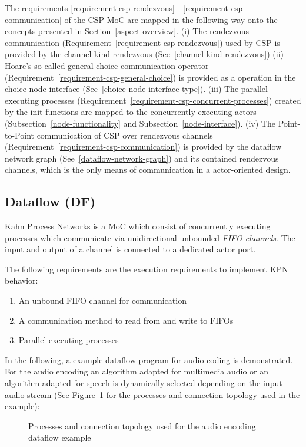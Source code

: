 The requirements \ref{requirement-csp-rendezvous} -
\ref{requirement-csp-communication} of the CSP MoC are mapped in the following way
onto the concepts presented in Section~\ref{aspect-overview}.
(i) The rendezvous communication (Requirement~\ref{requirement-csp-rendezvous})
used by CSP is provided by the channel kind rendezvous (See~\ref{channel-kind-rendezvous})
(ii) Hoare's so-called general choice communication operator (Requirement~\ref{requirement-csp-general-choice})
is provided as a operation in the choice node interface (See~\ref{choice-node-interface-type}).
(iii) The parallel executing processes (Requirement~\ref{requirement-csp-concurrent-processes})
created by the init functions are mapped to the concurrently executing actors
(Subsection~\ref{node-functionality} and Subsection~\ref{node-interface}).
(iv) The Point-to-Point communication of CSP over rendezvous channels (Requirement~\ref{requirement-csp-communication})
is provided by the dataflow network graph (See~\ref{dataflow-network-graph}) and
its contained rendezvous channels, which is the only means of communication in a
actor-oriented design.

\subsection{Dataflow (DF)}
Kahn Process Networks \cite{kahn:1974}
is a MoC which consist of concurrently executing processes
which communicate via unidirectional unbounded \emph{FIFO channels}.
The input and output of a channel is connected to a dedicated
actor port.

The following requirements are the execution requirements to
implement KPN behavior:

\begin{enumerate}
\item An unbound FIFO channel for communication
\item A communication method to read from and write to FIFOs
\item Parallel executing processes
\end{enumerate}

In the following, a example dataflow program for audio coding
is demonstrated. For the audio encoding an algorithm
adapted for multimedia audio or an algorithm adapted for speech
is dynamically selected depending on the input audio stream
(See Figure~\ref{fig:media-speech-audio-coding}
for the processes and connection topology used in the example):

\begin{figure}[h]
\centering

\caption{Processes and connection topology used for the audio encoding dataflow example}
\label{fig:media-speech-audio-coding}
\end{figure}



